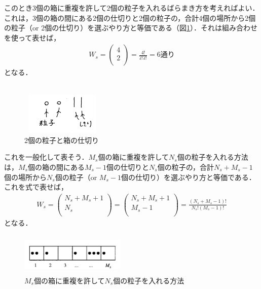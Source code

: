 このとき$3$個の箱に重複を許して$2$個の粒子を入れるばらまき方を考えればよい．これは，3個の箱の間にある2個の仕切りと2個の粒子の，合計4個の場所から2個の粒子（or 2個の仕切り）を選ぶやり方と等価である（図\ref{g2}）．それは組み合わせを使って表せば，
\begin{align}\label{}
W_s=
\left( 
\begin{array}{cc} 
4\\[5pt] 
2\\ 
\end{array} 
\right)
=\frac{4!}{2!2!}=6\text{通り}
  \end{align}
となる．\\


　\begin{figure}[H]
 \centering
\includegraphics[width=4cm,height=2cm]{file/basic_st/fig/bo2.png}
  \caption{2個の粒子と箱の仕切り}
  \label{g2}
\end{figure}






これを一般化して表そう．$M_s$個の箱に重複を許して$N_s$個の粒子を入れる方法は，$M_s$個の箱の間にある$M_s-1$個の仕切りと$N_s$個の粒子の，合計$N_s+M_s-1$個の場所から$N_s$個の粒子（or $M_s-1$個の仕切り）を選ぶやり方と等価である．これを式で表せば，
\begin{align}\label{b1}
W_s=
\left( 
\begin{array}{cc} 
N_s+M_s+1\\[5pt] 
N_s\\ 
\end{array} 
\right)
=
\left( 
\begin{array}{cc} 
N_s+M_s+1\\[5pt] 
M_s-1\\ 
\end{array} 
\right)
=\frac{(N_s+M_s-1)!}{N_s!(M_s-1)!}
  \end{align}
となる．
\begin{figure}[H]
 \centering
\includegraphics[width=5cm,height=2cm]{file/basic_st/fig/bo5.png}
  \caption{$M_s$個の箱に重複を許して$N_s$個の粒子を入れる方法}
  \label{g3}
\end{figure}

















